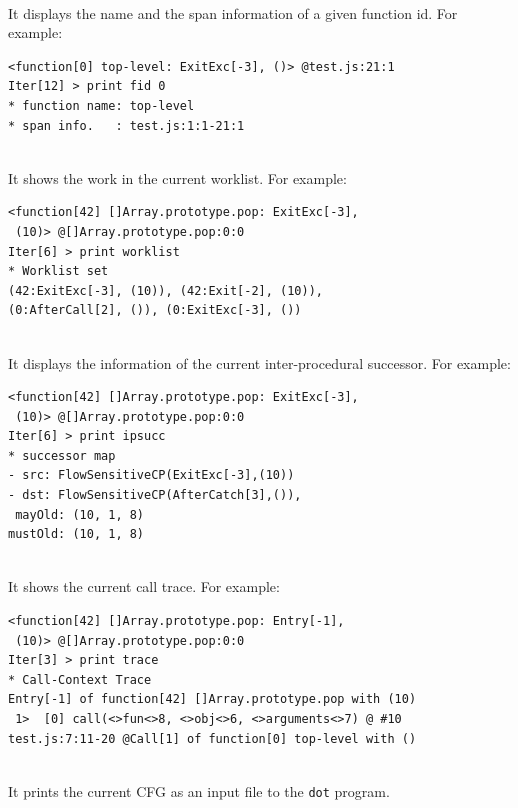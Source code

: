 \medskip\noindent
{}\\[.2em]
It displays the name and the span information of
a given function id.  For example:
{\small
\begin{verbatim}
<function[0] top-level: ExitExc[-3], ()> @test.js:21:1
Iter[12] > print fid 0
* function name: top-level
* span info.   : test.js:1:1-21:1
\end{verbatim}
}

\medskip\noindent
{}\\[.2em]
It shows the work in the current worklist.  For example:
{\small
\begin{verbatim}
<function[42] []Array.prototype.pop: ExitExc[-3],
 (10)> @[]Array.prototype.pop:0:0
Iter[6] > print worklist
* Worklist set
(42:ExitExc[-3], (10)), (42:Exit[-2], (10)),
(0:AfterCall[2], ()), (0:ExitExc[-3], ())
\end{verbatim}
}

\medskip\noindent
{}\\[.2em]
It displays the information of the current inter-procedural successor.
For example:
{\small
\begin{verbatim}
<function[42] []Array.prototype.pop: ExitExc[-3],
 (10)> @[]Array.prototype.pop:0:0
Iter[6] > print ipsucc
* successor map
- src: FlowSensitiveCP(ExitExc[-3],(10))
- dst: FlowSensitiveCP(AfterCatch[3],()),
 mayOld: (10, 1, 8)
mustOld: (10, 1, 8)
\end{verbatim}
}

\medskip\noindent
{}\\[.2em]
It shows the current call trace.  For example:
{\small
\begin{verbatim}
<function[42] []Array.prototype.pop: Entry[-1],
 (10)> @[]Array.prototype.pop:0:0
Iter[3] > print trace
* Call-Context Trace
Entry[-1] of function[42] []Array.prototype.pop with (10)
 1>  [0] call(<>fun<>8, <>obj<>6, <>arguments<>7) @ #10
test.js:7:11-20 @Call[1] of function[0] top-level with ()
\end{verbatim}
}

\medskip\noindent
{}\\[.2em]
It prints the current CFG as an input file to the \verb!dot! program.
